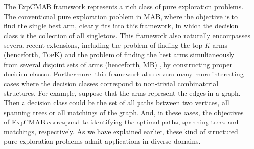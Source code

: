 \documentclass{article}
\newcommand{\Problem}{{\small \textsf{ExpCMAB}}\xspace}
\newcommand{\MultiIdent}{\textsc{TopK}\xspace}
\newcommand{\MultiBandit}{\textsc{MB}\xspace}
\begin{document}
The \Problem framework represents a rich class of pure exploration problems.
The conventional pure exploration problem in MAB, where the objective is to find the single best arm, clearly fits into this framework, in which the decision class is the collection of all singletons. 
This framework also naturally encompasses several recent extensions, including the problem of finding the top $K$ arms (henceforth, \MultiIdent) \citep{kalyanakrishnan2010efficient,kalyanakrishnan2012pac,bubeck2013multiple,zhou2014optimal} and the problem of finding the best arms simultaneously from several disjoint sets of arms (henceforth, \MultiBandit) \citep{NIPS2011_4478,bubeck2013multiple}, by constructing proper decision classes. 
Furthermore, this framework also covers many more interesting cases where the decision classes correspond to non-trivial combinatorial structures.
For example, suppose that the arms represent the edges in a graph.
Then a decision class could be the set of all paths between two vertices, all spanning trees or all matchings of the graph. 
And, in these cases, the objectives of \Problem correspond to identifying the optimal paths, spanning trees and matchings, respectively.
As we have explained earlier, these kind of structured pure exploration problems admit applications in diverse domains.%

\end{document}
